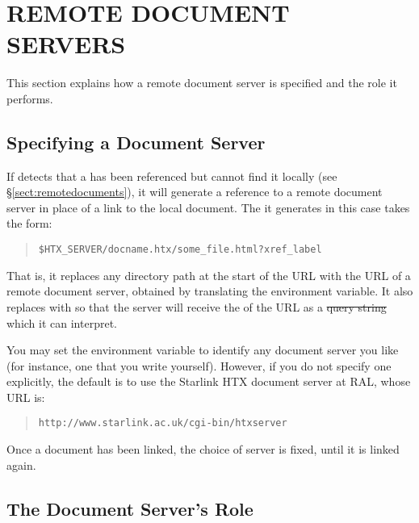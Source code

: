\section{\label{sect:remoteservers}REMOTE
DOCUMENT SERVERS}

This section explains how a remote document server is specified and
the role it performs.

\subsection{\label{sect:specifyingaserver}Specifying a Document Server}

If  detects that a  has been referenced
but cannot find it locally (see \S\ref{sect:remotedocuments}), it will
generate a reference to a remote document server in place of a link to
the local document. The  it generates in this case takes
the form:

\begin{quote}
\begin{verbatim}
$HTX_SERVER/docname.htx/some_file.html?xref_label
\end{verbatim}
\end{quote}

That is, it replaces any directory path at the start of the URL with
the URL of a remote document server, obtained by translating the
 environment variable. It also replaces
 with 
so that the server will receive the  of the URL as
a \st{query string} which it can interpret.

You may set the  environment variable to identify any
document server you like (for instance, one that you write
yourself). However, if you do not specify one explicitly, the default
is to use the Starlink HTX document server at RAL, whose URL is:

\begin{quote}
\begin{verbatim}
http://www.starlink.ac.uk/cgi-bin/htxserver
\end{verbatim}
\end{quote}

Once a document has been linked, the choice of server is fixed, until
it is linked again.

\subsection{\label{sect:docserversrole}The Document Server's Role}

